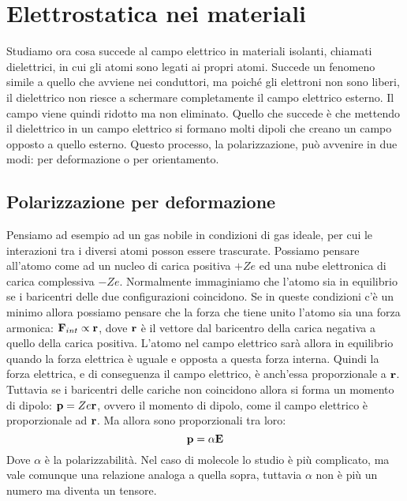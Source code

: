 \section{Elettrostatica nei materiali} %
\label{sec:elettrostatica_nei_materiali}

Studiamo ora cosa succede al campo elettrico in materiali isolanti, chiamati dielettrici, in cui gli atomi sono legati ai propri atomi. Succede un fenomeno simile a quello che avviene nei conduttori, ma poiché gli elettroni non sono liberi, il dielettrico non riesce a schermare completamente il campo elettrico esterno. Il campo viene quindi ridotto ma non eliminato. Quello che succede è che mettendo il dielettrico in un campo elettrico si formano molti dipoli che creano un campo opposto a quello esterno. Questo processo, la polarizzazione, può avvenire in due modi: per deformazione o per orientamento.

\subsection{Polarizzazione per deformazione} %
\label{ssub:polarizzazione_per_deformazione}

Pensiamo ad esempio ad un gas nobile in condizioni di gas ideale, per cui le interazioni tra i diversi atomi posson essere trascurate. Possiamo pensare all'atomo come ad un nucleo di carica positiva $+Ze$ ed una nube elettronica di carica complessiva $-Ze$. Normalmente immaginiamo che l'atomo sia in equilibrio se i baricentri delle due configurazioni coincidono. Se in queste condizioni c'è un minimo allora possiamo pensare che la forza che tiene unito l'atomo sia una forza armonica: $\mathbf F_{int} \propto \mathbf r $, dove $\mathbf r$ è il vettore dal baricentro della carica negativa a quello della carica positiva. L'atomo nel campo elettrico sarà allora in equilibrio quando la forza elettrica è uguale e opposta a questa forza interna. Quindi la forza elettrica, e di conseguenza il campo elettrico, è anch'essa proporzionale a $\mathbf r$. Tuttavia se i baricentri delle cariche non coincidono allora si forma un momento di dipolo: $\mathbf p = Ze \mathbf r$, ovvero il momento di dipolo, come il campo elettrico è proporzionale ad $\mathbf r$. Ma allora sono proporzionali tra loro:
\begin{equation}
    \mathbf p = \alpha \mathbf E
\end{equation}
Dove $\alpha$ è la polarizzabilità. Nel caso di molecole lo studio è più complicato, ma vale comunque una relazione analoga a quella sopra, tuttavia $\alpha$ non è più un numero ma diventa un tensore.

